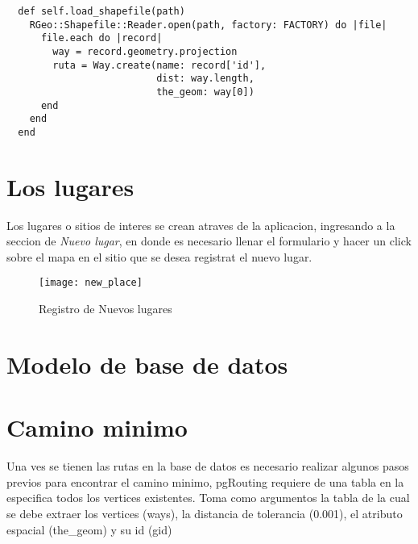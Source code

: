     \begin{center}
      \begin{verbatim}
  def self.load_shapefile(path)
    RGeo::Shapefile::Reader.open(path, factory: FACTORY) do |file|
      file.each do |record|
        way = record.geometry.projection
        ruta = Way.create(name: record['id'], 
                          dist: way.length,  
                          the_geom: way[0])
      end
    end
  end
      \end{verbatim}
    \end{center}

  \section{Los lugares} %
  \label{sec:los_lugares}
    Los lugares o sitios de interes se crean atraves de la aplicacion, ingresando a la seccion de \emph{Nuevo lugar}, en donde es necesario llenar el formulario y hacer un click sobre el mapa en el sitio que se desea registrat el nuevo lugar.

    \begin{figure}[!ht]
      \begin{center}
        \texttt{[image: new\_place]}
      \end{center}
      \caption{Registro de Nuevos lugares}
      \label{fig:new_place}
    \end{figure}
  
  \section{Modelo de base de datos} %
  \label{sec:modelo_de_base_de_datos}
  
  \section{Camino minimo} %
  \label{sec:camino_minimo}

    Una ves se tienen las rutas en la base de datos es necesario realizar algunos pasos previos para encontrar el camino minimo, pgRouting requiere de una tabla en la especifica todos los vertices existentes. Toma como argumentos la tabla de la cual se debe extraer los vertices (ways), la distancia de tolerancia (0.001), el atributo espacial (the\_geom) y su id (gid)

